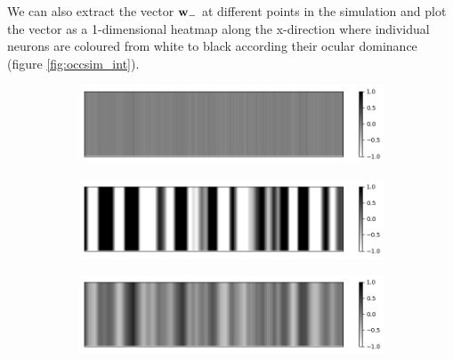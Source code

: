 \documentclass{article}
\begin{document}
We can also extract the vector ${\bf w}_-$ at different points in the simulation and plot the vector as a 1-dimensional heatmap along the x-direction where individual neurons are coloured from white to black according their ocular dominance (figure \ref{fig:occsim_int}).

\begin{figure}[h]
	\centering
	\begin{subfigure}[t]{0.49\linewidth}
		\centering
		\includegraphics[width = 1.0\linewidth, trim={0 0 0 0}, clip=true]{figures/occsim_int/i50.png}
	\end{subfigure}%
	\hspace{0.01\linewidth}
	\begin{subfigure}[t]{0.49\linewidth}
		\centering
		\includegraphics[width = 1.0\linewidth, trim={0 0 0 0}, clip=true]{figures/occsim_int/i300.png}
	\end{subfigure}%
	\hspace{0.01\linewidth}
	\begin{subfigure}[t]{0.49\linewidth}
		\centering
		\includegraphics[width = 1.0\linewidth, trim={0 0 0 0}, clip=true]{figures/occsim_int/i200.png}
	\end{subfigure}%
	\hspace{0.01\linewidth}
	\begin{subfigure}[t]{0.49\linewidth}

\end{subfigure}
\end{figure}
\end{document}
